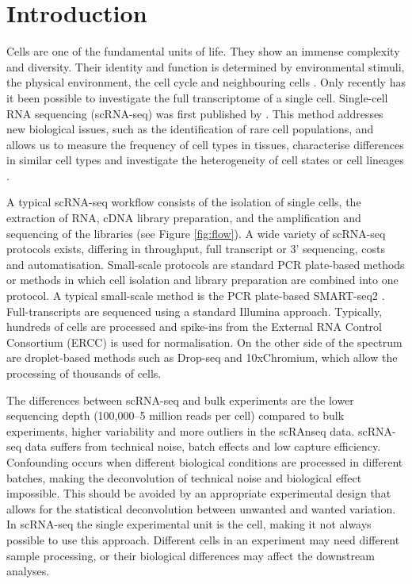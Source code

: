 \documentclass[12pt, a4paper]{article}\usepackage[]{graphicx}\usepackage[]{color}
\begin{document}
\bigskip
\newpage
\setcounter{page}{1}
\section{Introduction}
Cells are one of the fundamental units of life. They show an immense complexity and diversity. Their identity and function is determined by environmental stimuli, the physical environment, the cell cycle and neighbouring cells \citep{wagner2016revealing}. Only recently has it been possible to investigate the full transcriptome of a single cell. Single-cell RNA sequencing (scRNA-seq) was first published by \citet{tang2009mrna}. This method addresses new biological issues, such as the identification of rare cell populations, and allows us to measure the frequency of cell types in tissues, characterise differences in similar cell types and investigate the heterogeneity of cell states or cell lineages \citep{andrews2017identifying}.

A typical scRNA-seq workflow consists of the isolation of single cells, the extraction of RNA, cDNA library preparation, and the amplification and sequencing of the libraries (see Figure {\ref{fig:flow}}). A wide variety of scRNA-seq protocols exists, differing in throughput, full transcript or 3' sequencing, costs and automatisation. Small-scale protocols are standard PCR plate-based methods or methods in which cell isolation and library preparation are combined into one protocol. A typical small-scale method is the PCR plate-based SMART-seq2 \citep{picelli2013smart}. Full-transcripts are sequenced using a standard Illumina approach. Typically, hundreds of cells are processed and spike-ins from the External RNA Control Consortium (ERCC) is used for normalisation. On the other side of the spectrum are droplet-based methods such as Drop-seq and 10xChromium, which allow the processing of thousands of cells.

The differences between scRNA-seq and bulk experiments are the lower sequencing depth (100,000--5 million reads per cell) compared to bulk experiments, higher variability and more outliers in the scRAnseq data. scRNA-seq data suffers from technical noise, batch effects and low capture efficiency. Confounding occurs when different biological conditions are processed in different batches, making the deconvolution of technical noise and biological effect impossible. This should be avoided by an appropriate experimental design that allows for the statistical deconvolution between unwanted and wanted variation. In scRNA-seq the single experimental unit is the cell, making it not always possible to use this approach. Different cells in an experiment may need different sample processing, or their biological differences may affect the downstream analyses.
\end{document}
